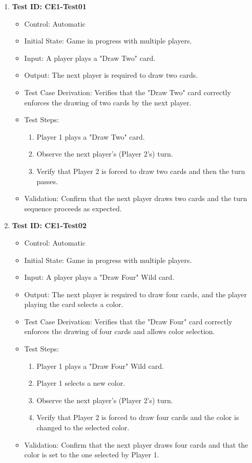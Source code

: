 \documentclass[12pt, titlepage]{article}
\begin{document}
\begin{enumerate}
    \item \textbf{Test ID: CE1-Test01}
        \begin{itemize}
            \item Control: Automatic
            \item Initial State: Game in progress with multiple players.
            \item Input: A player plays a "Draw Two" card.
            \item Output: The next player is required to draw two cards.
            \item Test Case Derivation: Verifies that the "Draw Two" card correctly enforces the drawing of two cards by the next player.
            \item Test Steps:
                \begin{enumerate}
                    \item Player 1 plays a "Draw Two" card.
                    \item Observe the next player’s (Player 2’s) turn.
                    \item Verify that Player 2 is forced to draw two cards and then the turn passes.
                \end{enumerate}
            \item Validation: Confirm that the next player draws two cards and the turn sequence proceeds as expected.
        \end{itemize}

    \item \textbf{Test ID: CE1-Test02}
        \begin{itemize}
            \item Control: Automatic
            \item Initial State: Game in progress with multiple players.
            \item Input: A player plays a "Draw Four" Wild card.
            \item Output: The next player is required to draw four cards, and the player playing the card selects a color.
            \item Test Case Derivation: Verifies that the "Draw Four" card correctly enforces the drawing of four cards and allows color selection.
            \item Test Steps:
                \begin{enumerate}
                    \item Player 1 plays a "Draw Four" Wild card.
                    \item Player 1 selects a new color.
                    \item Observe the next player’s (Player 2’s) turn.
                    \item Verify that Player 2 is forced to draw four cards and the color is changed to the selected color.
                \end{enumerate}
            \item Validation: Confirm that the next player draws four cards and that the color is set to the one selected by Player 1.
        \end{itemize}


\end{enumerate}
\end{document}
